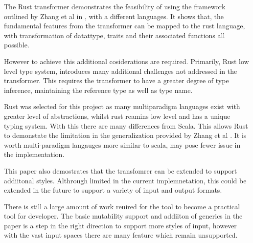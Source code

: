 \documentclass[ oneside,%
                    author={James Elgar},
                    degree={MEng},
                     title={Bidirectional transformer between functional and \\ object-oriented programming in Rust},
                  subtitle={}]{dissertation}
\newcommand{\weixin}{Zhang et al }
\begin{document}
The Rust transformer demonstrates the feasibility of using the framework outlined by \weixin in \cite{food}, with a different languages. It shows that, the fundamental features from the transformer can be mapped to the rust language, with transformation of datattype, traits and their associated functions all possible. 

However to achieve this additional cosiderations are required. Primarily, Rust low level type system, introduces many additional challenges not addressed in the \cite{food} transformer. This requires the transformer to have a greater degree of type inference, maintaining the reference type as well as type name.

Rust was selected for this project as many multiparadigm languages exist with greater level of abstractions, whilst rust reamins low level and has a unique typing system. With this there are many differences from Scala. This allows Rust to demonstate the limitation in the generalization provided by 
\weixin. It is worth multi-paradigm langauges more similar to scala, may pose fewer issue in the implementation.

This paper also demostrates that the transfomrer can be extended to support addiitonal styles. Althrough limited in the current implemnetation, this could be extended in the future to support a variety of input and output formats.

There is still a large amount of work reuired for the tool to become a practical tool for developer. The basic mutability support and addiiton of generics in the paper is a step in the right direction to support more styles of input, however with the vast input spaces there are many feature which remain unsupported.

\end{document}

